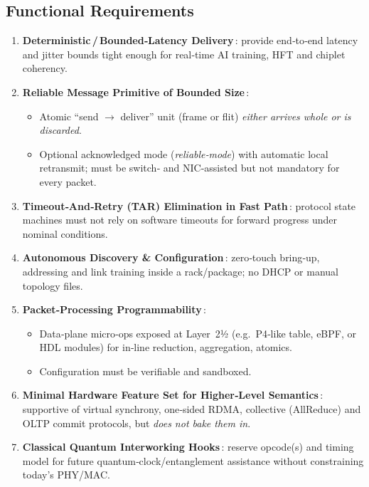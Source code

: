 \subsection{Functional Requirements}
\begin{enumerate} %
  \item \textbf{Deterministic\,/\,Bounded‑Latency Delivery}\,: provide end‑to‑end latency and jitter bounds tight enough for real‑time AI training, HFT and chiplet coherency.
  \item \textbf{Reliable Message Primitive of Bounded Size}\,:  
        \begin{itemize}
            \item Atomic “send $\rightarrow$ deliver” unit (frame or flit) \emph{either arrives whole or is discarded}.  
            \item Optional acknowledged mode (\textit{reliable‐mode}) with automatic local retransmit; must be switch‑ and NIC‑assisted but not mandatory for every packet.
        \end{itemize}
  \item \textbf{Timeout‐And‐Retry (TAR) Elimination in Fast Path}\,:  
        protocol state machines must not rely on software timeouts for forward progress under nominal conditions.
  \item \textbf{Autonomous Discovery \& Configuration}\,:  
        zero‑touch bring‑up, addressing and link training inside a rack/package; no DHCP or manual topology files.
  \item \textbf{Packet‑Processing Programmability}\,:  
        \begin{itemize}
            \item Data‑plane micro‑ops exposed at Layer 2½ (e.g.\ P4‑like table, eBPF, or HDL modules) for in‑line reduction, aggregation, atomics.  
            \item Configuration must be verifiable and sandboxed.
        \end{itemize}
  \item \textbf{Minimal Hardware Feature Set for Higher‑Level Semantics}\,:  
        supportive of virtual synchrony, one‑sided RDMA, collective (AllReduce) and OLTP commit protocols, but \emph{does not bake them in}.
  \item \textbf{Classical Quantum Interworking Hooks}\,:  
        reserve opcode(s) and timing model for future quantum‑clock/entanglement assistance without constraining today’s PHY/MAC.
\end{enumerate}

